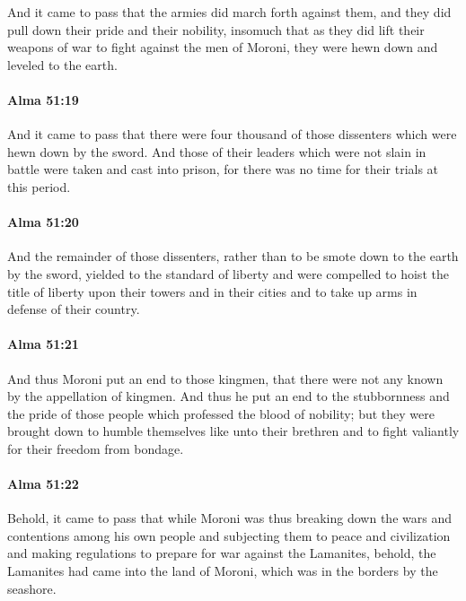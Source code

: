 			And it came to pass that the armies did march forth against them,
			and they did pull down their pride and their nobility,
			insomuch that as they did lift their weapons of war
			to fight against the men of Moroni,
			they were hewn down and leveled to the earth.

		\paragraph{Alma 51:19} %
			\label{ALMA-51-19}

			And it came to pass that there were four thousand of those dissenters
			which were hewn down by the sword.
			And those of their leaders which were not slain in battle
			were taken and cast into prison,
			for there was no time for their trials at this period.

		\paragraph{Alma 51:20} %
			\label{ALMA-51-20}

			And the remainder of those dissenters,
			rather than to be smote down to the earth by the sword,
			yielded to the standard of liberty
			and were compelled to hoist the title of liberty
			upon their towers and in their cities
			and to take up arms in defense of their country.

		\paragraph{Alma 51:21} %
			\label{ALMA-51-21}

			And thus Moroni put an end to those kingmen,
			that there were not any known by the appellation of kingmen.
			And thus he put an end to the stubbornness and the pride of those people
			which professed the blood of nobility;
			but they were brought down to humble themselves like unto their brethren
			and to fight valiantly for their freedom from bondage.

		\paragraph{Alma 51:22} %
			\label{ALMA-51-22}

			Behold, it came to pass that while Moroni was thus breaking down
			the wars and contentions among his own people
			and subjecting them to peace and civilization
			and making regulations to prepare for war against the Lamanites,
			behold, the Lamanites had came into the land of Moroni,
			which was in the borders by the seashore.

